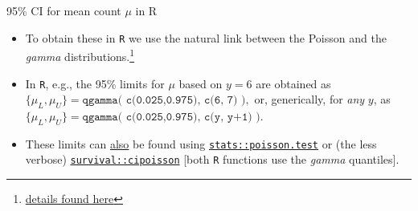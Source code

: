 \documentclass{beamer}\usepackage[]{graphicx}\usepackage[]{color}
\begin{document}
\begin{frame}{95\% CI for mean count $\mu$ in R}
\begin{itemize}
	\setlength\itemsep{1em}
	\item To obtain these in \texttt{R}	we use the  natural link between the Poisson and  the \textit{gamma} 
	distributions.\footnote{
		{ \tiny \href{http://www.epi.mcgill.ca/hanley/bios601/Mean-Quantile/forAccromathBackTranslate.pdf}{details found here} }} 
	\item In \texttt{R}, e.g., the 95\% limits for $\mu$ based on $y=6$ are obtained as 
	$\{ \mu_{L}, \mu_{U} \} =  \texttt{qgamma( c(0.025,0.975), c(6, 7) )},$
	or, generically, for \textit{any} $y$, as
	$\{ \mu_{L}, \mu_{U} \} =  \texttt{qgamma( c(0.025,0.975), c(y, y+1) )}.$
	
	\item These limits can \underline{also} be found using  
	\texttt{\underline{stats::poisson.test}} or (the less verbose)  
	\texttt{\underline{survival::cipoisson}} [both \texttt{R} functions use the \textit{gamma} quantiles].
\end{itemize}
\end{frame}
\end{document}
